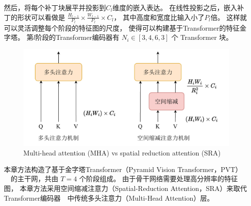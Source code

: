 然后，将每个补丁块展平并投影到$C_{l}$维度的嵌入表达。
在线性投影之后，嵌入补丁的形状可以看做是
$\frac{H_{l-1}}{P_{l}} \times \frac{W_{l-1}}{P_{l}} \times C_{l} $，
其中高度和宽度比输入小了$P_{l}$倍。
这样就可以灵活调整每个阶段的特征图的尺度，
使得可以构建基于Transformer的特征金字塔。
%
%
%
%
第$l$阶段的Transformer编码器有 $ N_{i} \in [3,4,6,3] $ 个 Transformer 块。
%
%
%
%
%
\begin{figure}[!ht]
	\centering
	\includegraphics[width=0.95\linewidth]{figures/chapter3/sra}
	{Multi-head attention (MHA) vs spatial reduction attention (SRA)}  
	\label{cpt3_fig1:sra}
\end{figure}




本章方法构造了基于金字塔Transformer（Pyramid Vision Transformer，PVT）
~\cite{wang2022pvt}~的主干网，共由 $T = 4$ 个阶段组成。 
由于骨干网络需要处理高分辨率的特征图，
本章方法采用空间缩减注意力（Spatial-Reduction Attention，SRA）来取代Transformer编码器~\cite{vaswani2017attention}~中传统多头注意力（Multi-Head Attention）层。



